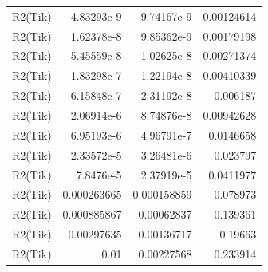 \begin{tabular}{rrrr}
  R2(Tik) & 4.83293e-9 & 9.74167e-9 & 0.00124614 \\
  R2(Tik) & 1.62378e-8 & 9.85362e-9 & 0.00179198 \\
  R2(Tik) & 5.45559e-8 & 1.02625e-8 & 0.00271374 \\
  R2(Tik) & 1.83298e-7 & 1.22194e-8 & 0.00410339 \\
  R2(Tik) & 6.15848e-7 & 2.31192e-8 & 0.006187 \\
  R2(Tik) & 2.06914e-6 & 8.74876e-8 & 0.00942628 \\
  R2(Tik) & 6.95193e-6 & 4.96791e-7 & 0.0146658 \\
  R2(Tik) & 2.33572e-5 & 3.26481e-6 & 0.023797 \\
  R2(Tik) & 7.8476e-5 & 2.37919e-5 & 0.0411977 \\
  R2(Tik) & 0.000263665 & 0.000158859 & 0.078973 \\
  R2(Tik) & 0.000885867 & 0.00062837 & 0.139361 \\
  R2(Tik) & 0.00297635 & 0.00136717 & 0.19663 \\
  R2(Tik) & 0.01 & 0.00227568 & 0.233914 \\
  \bottomrule
\end{tabular}
